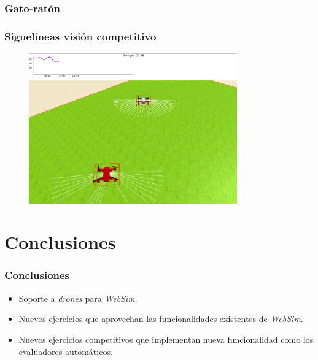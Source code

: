 \documentclass[xcolor={table}]{beamer}
\begin{document}
		\begin{frame}
			\frametitle{Gato-ratón}
				\frametitle{Siguelíneas visión competitivo}
       \begin{figure}
         \href{https://youtu.be/xA9Emhdk_HQ}
              {\includegraphics[width=0.8\textwidth]{img/evaluador_drone.png}}
       \end{figure}
		\end{frame}

	\section{Conclusiones}
		\begin{frame}
			\frametitle{Conclusiones}
			\begin{itemize}
				\item Soporte a \textit{drones} para \textit{WebSim}. 
				\item Nuevos ejercicios que aprovechan las funcionalidades existentes de \textit{WebSim}.
				\item Nuevos ejercicios competitivos que implementan nueva funcionalidad como los evaluadores automáticos. 
			\end{itemize}
		\end{frame}
	
	\appendix

	\backupbegin
	
	\backupend
\end{document}
